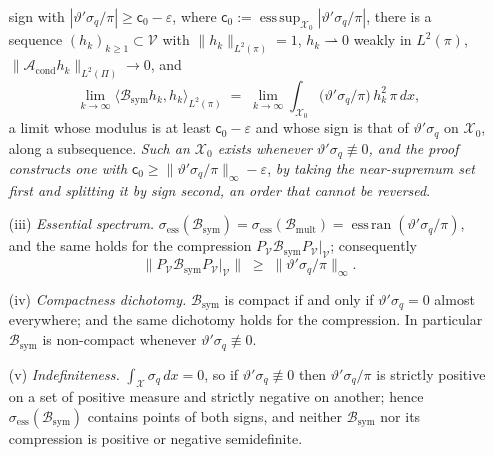 \begin{lemma}
\begin{enumerate}
sign with $|\vartheta'\sigma_q/\pi|\ge\mathsf c_0-\varepsilon$, where
$\mathsf c_0:=\operatorname*{ess\,sup}_{\mathcal X_0}|\vartheta'\sigma_q/\pi|$, there is a sequence
$(h_k)_{k\ge1}\subset\mathcal V$ with $\|h_k\|_{L^{2}(\pi)}=1$, $h_k\rightharpoonup0$ weakly in
$L^{2}(\pi)$, $\|\mathcal A_{\mathrm{cond}}h_k\|_{L^{2}(\Pi)}\to0$, and
\begin{equation}\label{eq:singseq}
\lim_{k\to\infty}\big\langle\mathcal B_{\mathrm{sym}}h_k,h_k\big\rangle_{L^{2}(\pi)}
\;=\;\lim_{k\to\infty}\int_{\mathcal X_0}\big(\vartheta'\sigma_q/\pi\big)\,h_k^{2}\,\pi\,dx ,
\end{equation}
a limit whose modulus is at least $\mathsf c_0-\varepsilon$ and whose sign is that of
$\vartheta'\sigma_q$ on $\mathcal X_0$, along a subsequence. \emph{Such an $\mathcal X_0$ exists whenever
$\vartheta'\sigma_q\not\equiv0$, and the proof constructs one with
$\mathsf c_0\ge\|\vartheta'\sigma_q/\pi\|_\infty-\varepsilon$}, \emph{by taking the near-supremum set
first and splitting it by sign second, an order that cannot be reversed}.
\item[(iii)] \emph{Essential spectrum.}
$\sigma_{\mathrm{ess}}(\mathcal B_{\mathrm{sym}})
=\sigma_{\mathrm{ess}}(\mathcal B_{\mathrm{mult}})=\operatorname{ess\,ran}(\vartheta'\sigma_q/\pi)$, and
the same holds for the compression
$P_{\mathcal V}\mathcal B_{\mathrm{sym}}P_{\mathcal V}|_{\mathcal V}$; consequently
\begin{equation}\label{eq:complower}
\big\|P_{\mathcal V}\mathcal B_{\mathrm{sym}}P_{\mathcal V}|_{\mathcal V}\big\|
\;\ge\;\big\|\vartheta'\sigma_q/\pi\big\|_\infty .
\end{equation}
\item[(iv)] \emph{Compactness dichotomy.} $\mathcal B_{\mathrm{sym}}$ is compact if and only if
$\vartheta'\sigma_q=0$ almost everywhere; and the same dichotomy holds for the compression. In particular
$\mathcal B_{\mathrm{sym}}$ is non-compact whenever $\vartheta'\sigma_q\not\equiv0$.
\item[(v)] \emph{Indefiniteness.} $\int_{\mathcal X}\sigma_q\,dx=0$, so if $\vartheta'\sigma_q\not\equiv0$
then $\vartheta'\sigma_q/\pi$ is strictly positive on a set of positive measure and strictly negative on
another; hence $\sigma_{\mathrm{ess}}(\mathcal B_{\mathrm{sym}})$ contains points of both signs, and
neither $\mathcal B_{\mathrm{sym}}$ nor its compression is positive or negative semidefinite.
\end{enumerate}
\end{lemma}

